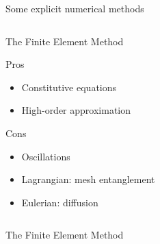 \begin{withoutheadline}
  \begin{frame}{Some explicit numerical methods}
    \vspace{-0.5cm}
    \begin{overprint}
      \begin{columns}
        \begin{column}{0.49\textwidth}
          \begin{block}{The Finite Element Method \cite{Belytschko}}
            \begin{footnotesize}
              \begin{block}{\footnotesize Pros}
                \vspace{-0.2cm}
                \begin{itemize}
                \item[] Constitutive equations
                \item[] High-order approximation
                \end{itemize}
              \end{block}
              \vspace{-0.2cm}
              \begin{block}{\footnotesize Cons}
                \vspace{-0.2cm}
                \begin{itemize}
                \item[] Oscillations 
                \item[] Lagrangian: mesh entanglement
                \item[] Eulerian: diffusion
                \end{itemize}
              \end{block}
            \end{footnotesize}
          \end{block}
        \end{column}
        \begin{column}{0.49\textwidth}
        \end{column}
      \end{columns}
      \vspace{-0.25cm}
      \begin{columns}
        \begin{column}{0.49\textwidth}
          \vspace{-0.1cm}
          \begin{block}{The Finite Element Method \cite{Belytschko}}

\end{block}
\end{column}
\end{columns}
\end{overprint}
\end{frame}
\end{withoutheadline}
